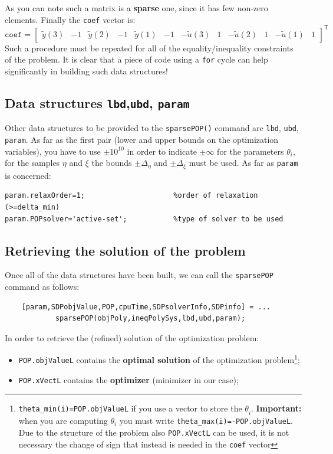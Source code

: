 \noindent
As you can note such a matrix is a \textbf{sparse} one, since it has few non-zero elements. Finally the \texttt{coef} vector is:
{{
    \begin{equation*}
        \texttt{coef}=\begin{bmatrix}
            \tilde{y}(3)&-1& \tilde{y}(2)& -1 &\tilde{y}(1) & -1& -\tilde{u}(3) & 1& -\tilde{u}(2) & 1 & -\tilde{u}(1) & 1
        \end{bmatrix}^\textsf{T}
    \end{equation*}
}}
Such a procedure must be repeated for all of the equality/inequality constraints of the problem. It is clear that a piece of code using a \texttt{for} cycle can help significantly in building such data structures! 

\subsection{Data structures \texttt{lbd},\texttt{ubd}, \texttt{param} }
\noindent
Other data structures to be provided to the \texttt{sparsePOP()} command are \texttt{lbd}, \texttt{ubd}, \texttt{param}. As far as the first pair (lower and upper bounds on the optimization variables), you have to use $\pm{10}^{10}$ in order to indicate $\pm{\infty}$ for the parameters $\theta_i$, for the samples $\eta$ and $\xi$ the bounds $\pm\Delta_\eta$ and $\pm\Delta_\xi$ must be used. As far as \texttt{param} is concerned:
\begin{verbatim}
param.relaxOrder=1;                     %order of relaxation (>=delta_min)
param.POPsolver='active-set';           %type of solver to be used
\end{verbatim}

\subsection{Retrieving the solution of the problem}
Once all of the data structures have been built, we can call the \texttt{sparsePOP} command as follows: 
\begin{verbatim}
    [param,SDPobjValue,POP,cpuTime,SDPsolverInfo,SDPinfo] = ...
            sparsePOP(objPoly,ineqPolySys,lbd,ubd,param);
\end{verbatim}

\noindent
In order to retrieve the (refined) solution of the optimization problem:
\begin{itemize}
    \itemsep0em
    \item \texttt{POP.objValueL} contains the \textbf{optimal solution} of the optimization problem\footnote{\texttt{theta\_min(i)=POP.objValueL} if you use a vector to store the $\underline{\theta}_i$. \textbf{Important: } when you are computing $\overline{\theta}_i$ you must write \texttt{theta\_max(i)=-POP.objValueL}. Due to the structure of the problem also \texttt{POP.xVectL} can be used, it is not necessary the change of sign that instead is needed in the \texttt{coef} vector};
    \item \texttt{POP.xVectL} contains the \textbf{optimizer} (minimizer in our case); 
\end{itemize}

